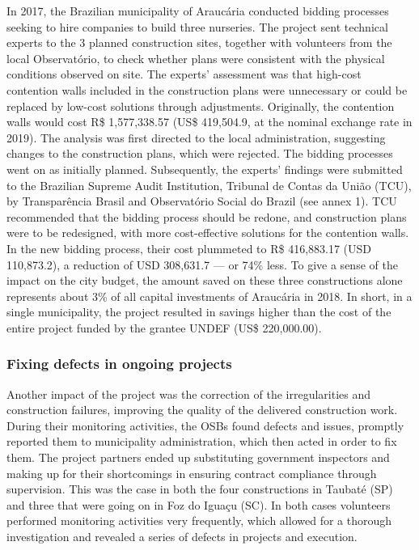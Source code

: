 \documentclass[]{AEA}
\begin{document}
In 2017, the Brazilian municipality of Araucária conducted bidding
processes seeking to hire companies to build three nurseries. The
project sent technical experts to the 3 planned construction sites,
together with volunteers from the local Observatório, to check whether
plans were consistent with the physical conditions observed on site. The
experts' assessment was that high-cost contention walls included in the
construction plans were unnecessary or could be replaced by low-cost
solutions through adjustments. Originally, the contention walls would
cost R\$ 1,577,338.57 (US\$ 419,504.9, at the nominal exchange rate in
2019). The analysis was first directed to the local administration,
suggesting changes to the construction plans, which were rejected. The
bidding processes went on as initially planned. Subsequently, the
experts' findings were submitted to the Brazilian Supreme Audit
Institution, Tribunal de Contas da União (TCU), by Transparência Brasil
and Observatório Social do Brazil (see annex 1). TCU recommended that
the bidding process should be redone, and construction plans were to be
redesigned, with more cost-effective solutions for the contention walls.
In the new bidding process, their cost plummeted to R\$ 416,883.17 (USD
110,873.2), a reduction of USD 308,631.7 --- or 74\% less. To give a
sense of the impact on the city budget, the amount saved on these three
constructions alone represents about 3\% of all capital investments of
Araucária in 2018. In short, in a single municipality, the project
resulted in savings higher than the cost of the entire project funded by
the grantee UNDEF (US\$ 220,000.00).

\hypertarget{fixing-defects-in-ongoing-projects}{%
\subsubsection{Fixing defects in ongoing
projects}\label{fixing-defects-in-ongoing-projects}}

Another impact of the project was the correction of the irregularities
and construction failures, improving the quality of the delivered
construction work. During their monitoring activities, the OSBs found
defects and issues, promptly reported them to municipality
administration, which then acted in order to fix them. The project
partners ended up substituting government inspectors and making up for
their shortcomings in ensuring contract compliance through supervision.
This was the case in both the four constructions in Taubaté (SP) and
three that were going on in Foz do Iguaçu (SC). In both cases volunteers
performed monitoring activities very frequently, which allowed for a
thorough investigation and revealed a series of defects in projects and
execution.
\end{document}

